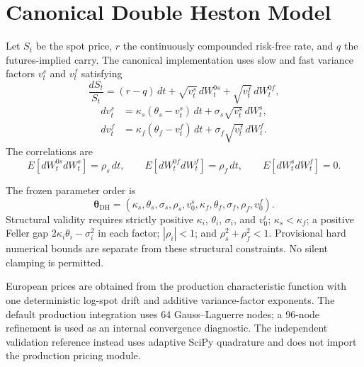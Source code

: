 \section{Canonical Double Heston Model}
\label{sec:model}

Let $S_t$ be the spot price, $r$ the continuously compounded risk-free rate, and
$q$ the futures-implied carry. The canonical implementation uses slow and fast
variance factors $v^s_t$ and $v^f_t$ satisfying
\begin{equation}
    \frac{dS_t}{S_t} = (r-q)\,dt
        + \sqrt{v^s_t}\,dW^{0s}_t
        + \sqrt{v^f_t}\,dW^{0f}_t,
\end{equation}
\begin{align}
    dv^s_t &= \kappa_s(\theta_s-v^s_t)\,dt
              + \sigma_s\sqrt{v^s_t}\,dW^s_t, \\
    dv^f_t &= \kappa_f(\theta_f-v^f_t)\,dt
              + \sigma_f\sqrt{v^f_t}\,dW^f_t.
\end{align}
The correlations are
\begin{equation}
    E[dW^{0s}_t dW^s_t]=\rho_s\,dt,\qquad
    E[dW^{0f}_t dW^f_t]=\rho_f\,dt,\qquad
    E[dW^s_t dW^f_t]=0.
\end{equation}

The frozen parameter order is
\begin{equation}
\bm{\theta}_{\mathrm{DH}}
= (\kappa_s,\theta_s,\sigma_s,\rho_s,v^s_0,
   \kappa_f,\theta_f,\sigma_f,\rho_f,v^f_0).
\end{equation}
Structural validity requires strictly positive $\kappa_i$, $\theta_i$, $\sigma_i$,
and $v^i_0$; $\kappa_s<\kappa_f$; a positive Feller gap
$2\kappa_i\theta_i-\sigma_i^2$ in each factor; $|\rho_i|<1$; and
$\rho_s^2+\rho_f^2<1$. Provisional hard numerical bounds are separate from these
structural constraints. No silent clamping is permitted.

European prices are obtained from the production characteristic function with one
deterministic log-spot drift and additive variance-factor exponents. The default
production integration uses 64 Gauss--Laguerre nodes; a 96-node refinement is used
as an internal convergence diagnostic. The independent validation reference instead
uses adaptive SciPy quadrature and does not import the production pricing module.
